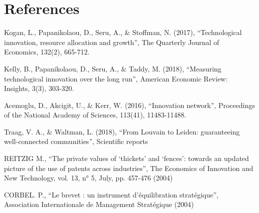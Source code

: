 \documentclass[12pt]{article}
\begin{document}
\section{References}
Kogan, L., Papanikolaou, D., Seru, A., \& Stoffman, N. (2017), “Technological innovation, resource allocation and growth”, The Quarterly Journal of Economics, 132(2), 665-712.

Kelly, B., Papanikolaou, D., Seru, A., \& Taddy, M. (2018), “Measuring technological innovation over the long run”, American Economic Review: Insights, 3(3), 303-320.

Acemoglu, D., Akcigit, U., \& Kerr, W. (2016), “Innovation network”, Proceedings of the National Academy of Sciences, 113(41), 11483-11488.

Traag, V. A., \& Waltman, L. (2018), “From Louvain to Leiden: guaranteeing well-connected communities”, Scientific reports

REITZIG M., “The private values of ‘thickets’ and ‘fences’: towards an updated picture of the use of patents across industries”, The Economics of Innovation and New Technology, vol. 13, n° 5, July, pp. 457-476 (2004)

CORBEL. P., “Le brevet : un instrument d’équilibration stratégique”, Association Internationale de Management Stratégique (2004)
\newpage
\end{document}
